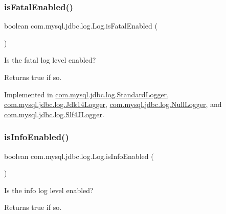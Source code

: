 \subsubsection{\texorpdfstring{is\+Fatal\+Enabled()}{isFatalEnabled()}}
{\footnotesize\ttfamily boolean com.\+mysql.\+jdbc.\+log.\+Log.\+is\+Fatal\+Enabled (\begin{DoxyParamCaption}{ }\end{DoxyParamCaption})}

Is the \textquotesingle{}fatal\textquotesingle{} log level enabled?

\begin{DoxyReturn}{Returns}
true if so. 
\end{DoxyReturn}


Implemented in \mbox{\hyperlink{classcom_1_1mysql_1_1jdbc_1_1log_1_1_standard_logger_ac51a86817ad34e81d451b8023e255845}{com.\+mysql.\+jdbc.\+log.\+Standard\+Logger}}, \mbox{\hyperlink{classcom_1_1mysql_1_1jdbc_1_1log_1_1_jdk14_logger_a3cf7110392bc00771a85b3e99b8841af}{com.\+mysql.\+jdbc.\+log.\+Jdk14\+Logger}}, \mbox{\hyperlink{classcom_1_1mysql_1_1jdbc_1_1log_1_1_null_logger_a7393a431840b4e7cb9ac18f0e2a88744}{com.\+mysql.\+jdbc.\+log.\+Null\+Logger}}, and \mbox{\hyperlink{classcom_1_1mysql_1_1jdbc_1_1log_1_1_slf4_j_logger_a63e7f859d44fddeb866c6198900af811}{com.\+mysql.\+jdbc.\+log.\+Slf4\+J\+Logger}}.

\mbox{\label{interfacecom_1_1mysql_1_1jdbc_1_1log_1_1_log_a8ca112798ee938dfb0fa06ffca504922}} 
\subsubsection{\texorpdfstring{is\+Info\+Enabled()}{isInfoEnabled()}}
{\footnotesize\ttfamily boolean com.\+mysql.\+jdbc.\+log.\+Log.\+is\+Info\+Enabled (\begin{DoxyParamCaption}{ }\end{DoxyParamCaption})}

Is the \textquotesingle{}info\textquotesingle{} log level enabled?

\begin{DoxyReturn}{Returns}
true if so. 
\end{DoxyReturn}


